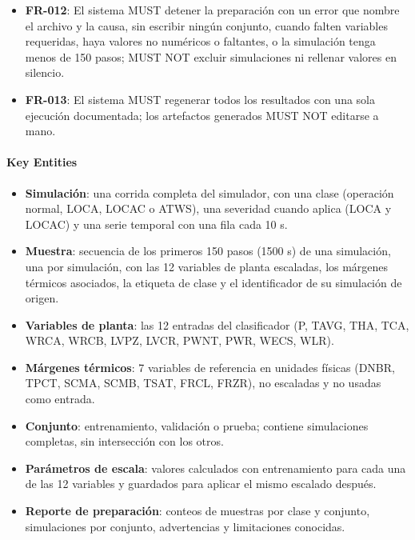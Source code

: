 \documentclass[12pt,a4paper]{article}
\providecommand{\tightlist}{\setlength{\itemsep}{0pt}\setlength{\parskip}{0pt}}
\newenvironment{documentogenerado}[2]{%
  \def\doccomando{#1}\def\docruta{#2}%
  \par\begingroup\small\setstretch{1.15}\sloppy%
}{\endgroup\par\medskip}
\begin{document}
\begin{documentogenerado}{/speckit-specify + /speckit-clarify}{specs\slash 001-preparacion-datos\slash spec.md}
\begin{itemize}
  \textbf{FR-011}: El sistema MUST producir el mismo resultado al repetir la preparación con los mismos datos de origen y la misma configuración.
\item
  \textbf{FR-012}: El sistema MUST detener la preparación con un error que nombre el archivo y la causa, sin escribir ningún conjunto, cuando falten variables requeridas, haya valores no numéricos o faltantes, o la simulación tenga menos de 150 pasos; MUST NOT excluir simulaciones ni rellenar valores en silencio.
\item
  \textbf{FR-013}: El sistema MUST regenerar todos los resultados con una sola ejecución documentada; los artefactos generados MUST NOT editarse a mano.
\end{itemize}

\paragraph{Key Entities}

\begin{itemize}
\tightlist
\item
  \textbf{Simulación}: una corrida completa del simulador, con una clase (operación normal, LOCA, LOCAC o ATWS), una severidad cuando aplica (LOCA y LOCAC) y una serie temporal con una fila cada 10 s.
\item
  \textbf{Muestra}: secuencia de los primeros 150 pasos (1500 s) de una simulación, una por simulación, con las 12 variables de planta escaladas, los márgenes térmicos asociados, la etiqueta de clase y el identificador de su simulación de origen.
\item
  \textbf{Variables de planta}: las 12 entradas del clasificador (P, TAVG, THA, TCA, WRCA, WRCB, LVPZ, LVCR, PWNT, PWR, WECS, WLR).
\item
  \textbf{Márgenes térmicos}: 7 variables de referencia en unidades físicas (DNBR, TPCT, SCMA, SCMB, TSAT, FRCL, FRZR), no escaladas y no usadas como entrada.
\item
  \textbf{Conjunto}: entrenamiento, validación o prueba; contiene simulaciones completas, sin intersección con los otros.
\item
  \textbf{Parámetros de escala}: valores calculados con entrenamiento para cada una de las 12 variables y guardados para aplicar el mismo escalado después.
\item
  \textbf{Reporte de preparación}: conteos de muestras por clase y conjunto, simulaciones por conjunto, advertencias y limitaciones conocidas.
\end{itemize}


\end{documentogenerado}
\end{document}
